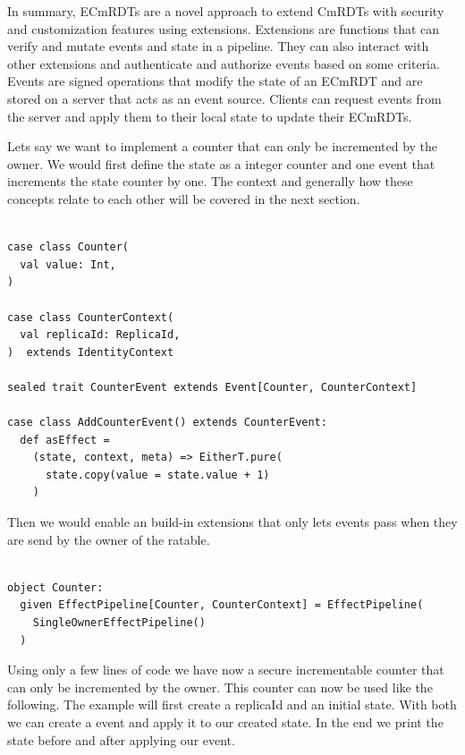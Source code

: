 \documentclass[
	ngerman,
	ruledheaders=section,   %
	class=report,		    %
	thesis={type=bachelor}, %
	accentcolor=9c,			%
	custommargins=true,    %
	marginpar=false,        %
	parskip=half-,          %
	fontsize=11pt,          %
]{tudapub}
\begin{document}
In summary, ECmRDTs are a novel approach to extend CmRDTs with security and customization features using extensions. Extensions are functions that can verify and mutate events and state in a pipeline. They can also interact with other extensions and authenticate and authorize events based on some criteria. Events are signed operations that modify the state of an ECmRDT and are stored on a server that acts as an event source. Clients can request events from the server and apply them to their local state to update their ECmRDTs.

Lets say we want to implement a counter that can only be incremented by the owner. We would first define the state as a integer counter and one event that increments the state counter by one. The context and generally how these concepts relate to each other will be covered in the next section.

\begin{lstlisting}
    
case class Counter(
  val value: Int,
) 

case class CounterContext(
  val replicaId: ReplicaId,
)  extends IdentityContext

sealed trait CounterEvent extends Event[Counter, CounterContext]

case class AddCounterEvent() extends CounterEvent:
  def asEffect =
    (state, context, meta) => EitherT.pure(
      state.copy(value = state.value + 1)
    )

\end{lstlisting}

Then we would enable an build-in extensions that only lets events pass when they are send by the owner of the ratable.

\begin{lstlisting}

object Counter:
  given EffectPipeline[Counter, CounterContext] = EffectPipeline(
    SingleOwnerEffectPipeline()
  )

\end{lstlisting}

Using only a few lines of code we have now a secure incrementable counter that can only be incremented by the owner. This counter can now be used like the following. The example will first create a replicaId and an initial state. With both we can create a event and apply it to our created state. In the end we print the state before and after applying our event.
\end{document}
